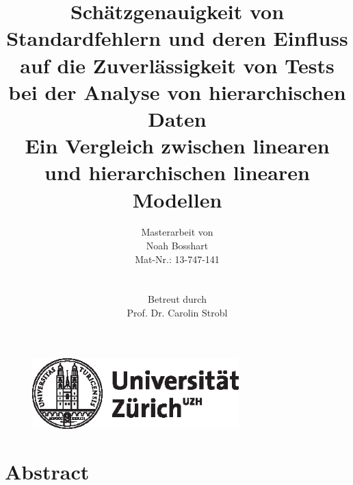 \documentclass[12pt]{article}\usepackage[]{graphicx}\usepackage[]{color}
\title{Schätzgenauigkeit von Standardfehlern und deren Einfluss auf die Zuverlässigkeit von Tests bei der Analyse von hierarchischen Daten \\ \large{Ein Vergleich zwischen linearen und hierarchischen linearen Modellen}}
\author{Masterarbeit von \\ Noah Bosshart \\ Mat-Nr.: 13-747-141 \\ \\ \\ Betreut durch \\ Prof. Dr. Carolin Strobl}
\begin{document}

\begin{figure}[t]
  \centering
  \includegraphics[width = 8cm]{uzh_logo}
\end{figure}

\maketitle
\thispagestyle{empty}

\newpage
{}
\tableofcontents

\newpage
\listoffigures

\newpage
\listoftables
\newpage


\section*{Abstract}
\newpage

\end{document}
